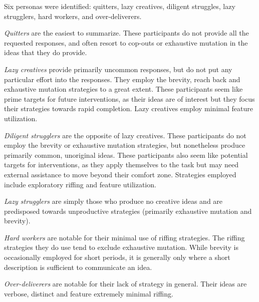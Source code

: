 Six personas were identified: quitters, lazy creatives, diligent struggles, lazy strugglers, hard workers, and over-deliverers.

\emph{Quitters} are the easiest to summarize. These participants do not provide all the requested responses, and often resort to cop-outs or exhaustive mutation in the ideas that they do provide.

\emph{Lazy creatives} provide primarily uncommon responses, but do not put any particular effort into the responses. They employ the brevity, reach back and exhaustive mutation strategies to a great extent. These participants seem like prime targets for future interventions, as their ideas are of interest but they focus their strategies towards rapid completion. Lazy creatives employ minimal feature utilization.

\emph{Diligent strugglers} are the opposite of lazy creatives. These participants do not employ the brevity or exhaustive mutation strategies, but nonetheless produce primarily common, unoriginal ideas. These participants also seem like potential targets for interventions, as they apply themselves to the task but may need external assistance to move beyond their comfort zone. Strategies employed include exploratory riffing and feature utilization.

\emph{Lazy strugglers} are simply those who produce no creative ideas and are predisposed towards unproductive strategies (primarily exhaustive mutation and brevity).

\emph{Hard workers} are notable for their minimal use of riffing strategies. The riffing strategies they do use tend to exclude exhaustive mutation. While brevity is occasionally employed for short periods, it is generally only where a short description is sufficient to communicate an idea.

\emph{Over-deliverers} are notable for their lack of strategy in general. Their ideas are verbose, distinct and feature extremely minimal riffing. 
